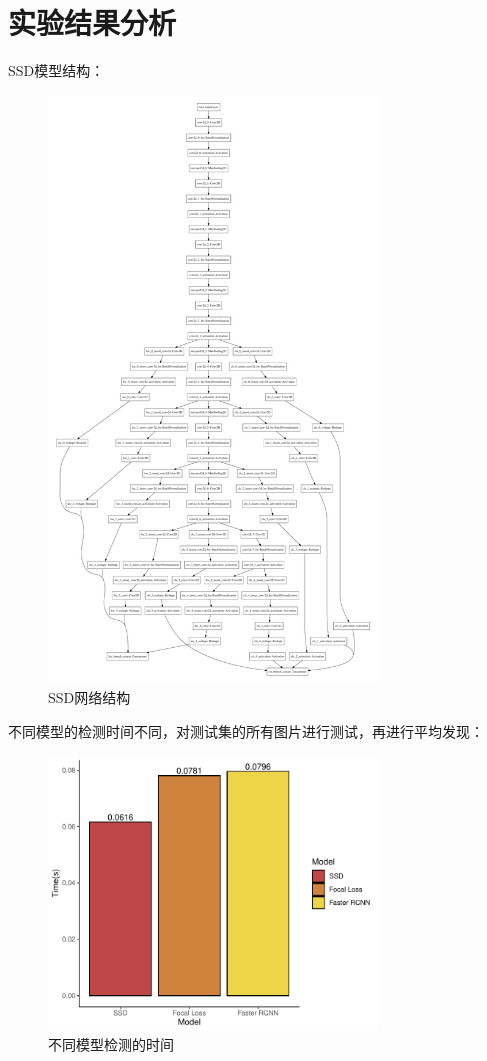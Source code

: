 \documentclass[journal,transmag]{IEEEtran}
\begin{document}
\section{实验结果分析}
SSD模型结构：
\begin{figure}[h]
\centering
\includegraphics[width=3.44in]{modelgraph.pdf}
\caption{SSD网络结构}
\end{figure}
不同模型的检测时间不同，对测试集的所有图片进行测试，再进行平均发现：
\begin{figure}[h]
\centering
\includegraphics[width=3.44in]{time.pdf}
\caption{不同模型检测的时间}
\end{figure}
\end{document}

